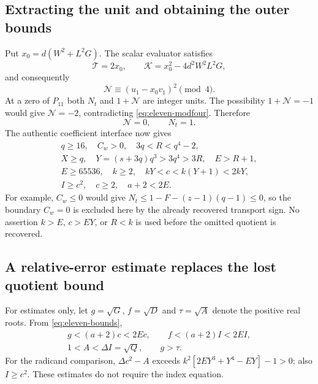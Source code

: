 \subsection{Extracting the unit and obtaining the outer bounds}

Put $x_0=d(W^2+L^2G)$. The scalar evaluator satisfies
\[
 \mathcal T=2x_0,\qquad
 \mathcal K=x_0^2-4d^2W^2L^2G,
\]
and consequently
\begin{equation}\label{eq:eleven-modfour}
 \mathcal N\equiv(u_1-x_0v_1)^2\pmod4.
\end{equation}
At a zero of $P_{11}$ both $N_t$ and $1+\mathcal N$ are integer
units. The possibility $1+\mathcal N=-1$ would give
$\mathcal N=-2$, contradicting \eqref{eq:eleven-modfour}. Therefore
\[
 \mathcal N=0,\qquad N_t=1.
\]
The authentic coefficient interface now gives
\begin{equation}\label{eq:eleven-bounds}
 \begin{gathered}
 q\ge16,\quad C_w>0,\quad 3q<R<q^4-2,\\
 X\ge q,\quad Y=(s+3q)q^3>3q^4>3R,\quad E>R+1,\\
 E\ge65536,\quad k\ge2,\quad kY<c<k(Y+1)<2kY,\\
 I\ge c^2,\quad c\ge2,\quad a+2<2E.
 \end{gathered}
\end{equation}
For example, $C_w\le0$ would give
$N_t\le1-F-(z-1)(q-1)\le0$, so the boundary $C_w=0$ is excluded
here by the already recovered transport sign. No assertion $k>E$,
$c>EY$, or $R<k$ is used before the omitted quotient is recovered.

\subsection{A relative-error estimate replaces the lost quotient bound}

For estimates only, let $g=\sqrt G$, $f=\sqrt D$ and $\tau=\sqrt A$
denote the positive real roots. From \eqref{eq:eleven-bounds},
\begin{equation}\label{eq:eleven-roots}
 \begin{gathered}
 g<(a+2)c<2Ec,\qquad f<(a+2)I<2EI,\\
 1<A<\Delta I=\sqrt Q,\qquad g>\tau.
 \end{gathered}
\end{equation}
For the radicand comparison, $\Delta c^2-A$ exceeds
$k^2[2EY^3+Y^4-EY]-1>0$; also $I\ge c^2$. These estimates do
not require the index equation.

